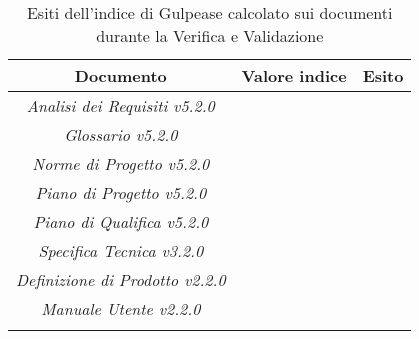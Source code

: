 \begin{longtable}{|c|p{3cm}|p{3cm}|}
\toprule
\textbf{Documento} & \textbf{Valore indice} & \textbf{Esito} \\


\midrule
\emph{Analisi dei Requisiti v5.2.0} &  &  \\
\midrule
\emph{Glossario v5.2.0} &  &  \\
\midrule
\emph{Norme di Progetto v5.2.0} &  &  \\
\midrule
\emph{Piano di Progetto v5.2.0} &  & \\
\midrule
\emph{Piano di Qualifica v5.2.0} &  &  \\
\midrule
\emph{Specifica Tecnica v3.2.0} &  & \\
\midrule
\emph{Definizione di Prodotto v2.2.0} &  & \\
\midrule
\emph{Manuale Utente v2.2.0} &  & \\
\bottomrule
\caption{Esiti dell'indice di Gulpease calcolato sui documenti durante la Verifica e Validazione}
\label{tab:changelog}
\end{longtable}

